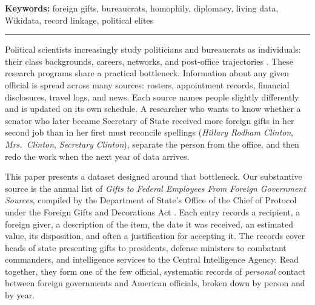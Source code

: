 \documentclass[11pt]{article}
\makeatletter
\renewcommand\section{\@startsection{section}{1}{\z@}{-3.0ex plus -1ex minus -.2ex}{1.5ex plus .2ex}{\normalfont\large\bfseries\MakeUppercase}}
\makeatother
\begin{document}
\medskip
\noindent\textbf{Keywords:} foreign gifts, bureaucrats, homophily, diplomacy, living data, Wikidata, record linkage, political elites

\vspace{1em}
\hrule
\vspace{1em}

\section{Introduction}

Political scientists increasingly study politicians and bureaucrats as individuals: their class backgrounds, careers, networks, and post-office trajectories \citep[e.g.,][]{carnes2023economic,lewis2008politics,teodoro2011bureaucratic}. These research programs share a practical bottleneck. Information about any given official is spread across many sources: rosters, appointment records, financial disclosures, travel logs, and news. Each source names people slightly differently and is updated on its own schedule. A researcher who wants to know whether a senator who later became Secretary of State received more foreign gifts in her second job than in her first must reconcile spellings (\emph{Hillary Rodham Clinton}, \emph{Mrs.\ Clinton}, \emph{Secretary Clinton}), separate the person from the office, and then redo the work when the next year of data arrives.

This paper presents a dataset designed around that bottleneck. Our substantive source is the annual list of \emph{Gifts to Federal Employees From Foreign Government Sources}, compiled by the Department of State's Office of the Chief of Protocol under the Foreign Gifts and Decorations Act \citep{usc7342}. Each entry records a recipient, a foreign giver, a description of the item, the date it was received, an estimated value, its disposition, and often a justification for accepting it. The records cover heads of state presenting gifts to presidents, defense ministers to combatant commanders, and intelligence services to the Central Intelligence Agency. Read together, they form one of the few official, systematic records of \emph{personal} contact between foreign governments and American officials, broken down by person and by year.
\end{document}
